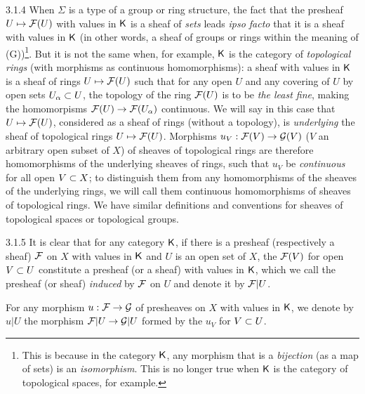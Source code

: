\documentclass[../main.tex]{subfiles}
\begin{document}
\begin{env}{3.1.4}
When $\Sigma$ is a type of a group or ring structure, the fact that
the presheaf $U\mapsto\mathcal{F}(U)$ with values in $\mathsf{K}$ is a sheaf of \emph{sets} leads \emph{ipso facto}
that it is a sheaf with values in $\mathsf{K}$ (in other words, a sheaf of groups or rings
within the meaning of (G))\footnote{This is because in the category $\mathsf{K}$, any morphism that is a
\emph{bijection} (as a map of sets) is an \emph{isomorphism}. This is no longer true when $\mathsf{K}$
is the category of topological spaces, for example.}. But it is not the same when, for example,
$\mathsf{K}$ is the category of \emph{topological rings} (with morphisms as continuous homomorphisms): a sheaf
with values in $\mathsf{K}$ is a sheaf of rings $U\mapsto\mathcal{F}(U)$ such that for any open $U$
and any covering of $U$ by open sets $U_\alpha\subset U$, the topology of the ring $\mathcal{F}(U)$
is to be \emph{the least fine}, making the homomorpisms $\mathcal{F}(U)\to\mathcal{F}(U_\alpha)$ continuous. We will say in
this case that $U\mapsto\mathcal{F}(U)$, considered as a sheaf of rings (without a topology), is
\emph{underlying} the sheaf of topological rings $U\mapsto\mathcal{F}(U)$. Morphisms $u_V:\mathcal{F}(V)\to\mathcal{G}(V)$
($V$ an arbitrary open subset of $X$) of sheaves of topological rings are therefore homomorphisms of the
underlying sheaves of rings, such that $u_V$ be \emph{continuous} for all
open $V\subset X$; to distinguish them from any homomorphisms of the sheaves
of the underlying rings, we will call them continuous homomorphisms of sheaves of topological rings.
We have similar definitions and conventions for sheaves of topological spaces or topological groups.
\end{env}

\begin{env}{3.1.5}
It is clear that for any category $\mathsf{K}$, if there is a presheaf (respectively a
sheaf) $\mathcal{F}$ on $X$ with values in $\mathsf{K}$ and $U$ is an open set of $X$, the $\mathcal{F}(V)$ for
open $V\subset U$ constitute a presheaf (or a sheaf) with values in $\mathsf{K}$, which we call
the presheaf (or sheaf) \emph{induced} by $\mathcal{F}$ on $U$ and denote it by $\mathcal{F}|U$.

For any morphism $u:\mathcal{F}\to\mathcal{G}$ of presheaves on $X$ with values in $\mathsf{K}$, we
denote by $u|U$ the morphism $\mathcal{F}|U\to\mathcal{G}|U$ formed by the $u_V$ for $V\subset U$.
\end{env}
\end{document}
